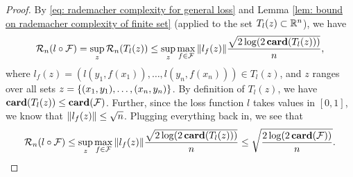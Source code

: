 \begin{proof}
By \eqref{eq: rademacher complexity for general loss} and Lemma \ref{lem: bound on rademacher complexity of finite set} (applied to the set $T_l(z) \subset \mathbb{R}^n$), we have
\[
    \mathcal{R}_n(l \circ \mathcal{F}) = \sup_z \mathcal{R}_n(T_l(z)) \leq \sup_z \max_{f \in \mathcal{F}} \norm{l_f(z)} \frac{\sqrt{2 \log(2 \, \mathrm{\mathbf{card}}(T_l(z)))}}{n},
\]
where $l_f(z) = ( l(y_1, f(x_1)), \dots, l(y_n, f(x_n)) ) \in T_l(z)$, and $z$ ranges over all sets $z = \left\{(x_1, y_1), \dots, (x_n, y_n)\right\}$. By definition of $T_l(z)$, we have $\mathrm{\mathbf{card}}(T_l(z)) \leq \mathrm{\mathbf{card}}(\mathcal{F})$. Further, since the loss function $l$ takes values in $[0, 1]$, we know that $\norm{l_f(z)} \leq \sqrt{n}$. Plugging everything back in, we see that
\[
    \mathcal{R}_n(l \circ \mathcal{F}) \leq \sup_z \max_{f \in \mathcal{F}} \norm{l_f(z)} \frac{\sqrt{2 \log(2 \, \mathrm{\mathbf{card}}(T_l(z)))}}{n} \leq \sqrt{\frac{2 \log(2 \, \mathrm{\mathbf{card}}(\mathcal{F}))}{n}}.
\]
\end{proof}
